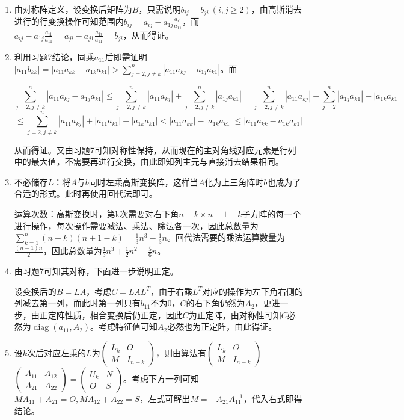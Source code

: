\documentclass[a4paper,UTF8,fontset=windows]{ctexart}
\DeclareMathOperator{\diag}{diag}
\begin{document}
\begin{enumerate}
\item
由对称阵定义，设变换后矩阵为$B$，只需说明$b_{ij}=b_{ji}\ (i,j\ge2)$，由高斯消去进行的行变换操作可知范围内$b_{ij}=a_{ij}-a_{1j}\frac{a_{i1}}{a_{11}}$，而$a_{ij}-a_{1j}\frac{a_{i1}}{a_{11}}=a_{ji}-a_{j1}\frac{a_{1i}}{a_{11}}=b_{ji}$，从而得证。

\item
利用习题7结论，同乘$a_{11}$后即需证明$|a_{11}b_{kk}|=|a_{11}a_{kk}-a_{1k}a_{k1}|>\sum_{j=2,j\ne k}^{n}|a_{11}a_{kj}-a_{1j}a_{k1}|$。而

$$\sum_{j=2,j\ne k}^{n}|a_{11}a_{kj}-a_{1j}a_{k1}|\le\sum_{j=2,j\ne k}^{n}|a_{11}a_{kj}|+\sum_{j=2,j\ne k}^{n}|a_{1j}a_{k1}|=\sum_{j=2,j\ne k}^{n}|a_{11}a_{kj}|+\sum_{j=2}^{n}|a_{1j}a_{k1}|-|a_{1k}a_{k1}|$$
$$\le\sum_{j=2,j\ne k}^{n}|a_{11}a_{kj}|+|a_{11}a_{k1}|-|a_{1k}a_{k1}|<|a_{11}a_{kk}|-|a_{1k}a_{k1}|\le|a_{11}a_{kk}-a_{1k}a_{k1}|$$

从而得证。又由习题7可知对称性保持，从而现在的主对角线对应元素是行列中的最大值，不需要再进行交换，由此即知列主元与直接消去结果相同。

\item
不必储存$L$：将$A$与$b$同时左乘高斯变换阵，这样当$A$化为上三角阵时$b$也成为了合适的形式。此时再使用回代法即可。

运算次数：高斯变换时，第k次需要对右下角$n-k\times n+1-k$子方阵的每一个进行操作，每次操作需要减法、乘法、除法各一次，因此总数量为$\sum_{k=1}^n(n-k)(n+1-k)=\frac{1}{3}n^3-\frac{1}{3}n$。回代法需要的乘法运算数量为$\frac{(n-1)n}{2}$，因此总数量为$\frac{1}{3}n^3+\frac{1}{2}n^2-\frac{5}{6}n$。

\item
由习题7可知其对称，下面进一步说明正定。

设变换后的$B=LA$，考虑$C=LAL^{T}$，由于右乘$L^T$对应的操作为左下角右侧的列减去第一列，而此时第一列只有$b_{11}$不为0，$C$的右下角仍然为$A_2$，更进一步，由正定阵性质，相合变换后仍正定，因此$C$为正定阵，由对称性可知$C$必然为$\diag(a_{11},A_2)$。考虑特征值可知$A_2$必然也为正定阵，由此得证。

\item
设$k$次后对应左乘的$L$为$\begin{pmatrix}L_k&O\\M&I_{n-k}\end{pmatrix}$，则由算法有$\begin{pmatrix}L_k&O\\M&I_{n-k}\end{pmatrix}$$\begin{pmatrix}A_{11}&A_{12}\\A_{21}&A_{22}\end{pmatrix}=\begin{pmatrix}U_k&N\\O&S\end{pmatrix}$。考虑下方一列可知$MA_{11}+A_{21}=O,MA_{12}+A_{22}=S$，左式可解出$M=-A_{21}A_{11}^{-1}$，代入右式即得结论。


\end{enumerate}
\end{document}
